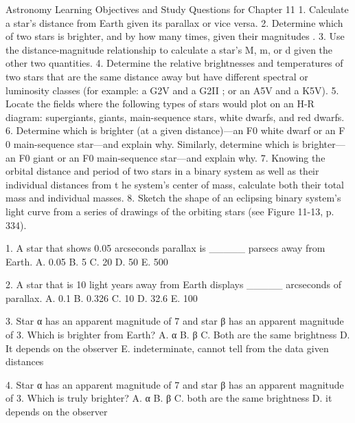 

Astronomy
Learning Objectives and Study Questions for
Chapter 11
1.  Calculate a star's distance from Earth given its parallax or vice versa.
2.  Determine which of two stars is brighter, and by how many times, given their magnitudes .
3.  Use the distance-magnitude relationship to calculate a star's M, m, or d given the other two quantities.
4.  Determine the relative brightnesses and temperatures of two stars that are the same distance away but have different spectral or luminosity classes (for example: a G2V and a G2II ; or an A5V and a K5V).
5.  Locate the fields where the following types of stars would plot on an H-R diagram: supergiants, giants, main-sequence stars, white dwarfs, and red dwarfs.
6.  Determine which is brighter (at a given distance)—an F0 white dwarf or an F 0 main-sequence star—and explain why. Similarly, determine which is brighter—an F0 giant or an F0 main-sequence star—and explain why.
7.  Knowing the orbital distance and period of two stars in a binary system as well as their individual distances from t he system's center of mass, calculate both their total mass and individual masses.
8.  Sketch the shape of an eclipsing binary system's light curve from a series of drawings of the orbiting stars (see Figure 11-13, p. 334).


1.  A star that shows 0.05 arcseconds parallax is _____ parsecs away from Earth. 
A.  0.05
B.  5
C.  20
D.  50
E.  500

2.  A star that is 10 light years away from Earth displays _____ arcseconds of parallax.
A.  0.1
B.  0.326
C.  10
D.  32.6
E.  100

3.  Star α has an apparent magnitude of 7 and star β has an apparent magnitude of 3. Which is brighter from Earth?
A.  α
B.  β
C.  Both are the same brightness
D.  It depends on the observer
E.  indeterminate, cannot tell from the data given distances

4.  Star α has an apparent magnitude of 7 and star β has an apparent magnitude of 3. Which is truly brighter?
A.  α
B.  β
C.  both are the same brightness
D.  it depends on the observer


